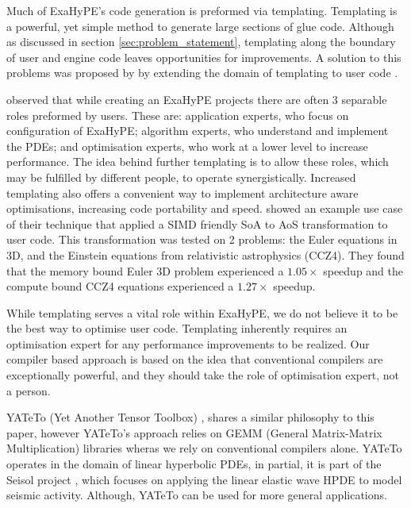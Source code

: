 


Much of ExaHyPE's code generation is preformed via templating.
Templating is a powerful, yet simple method to generate large sections of glue code.
Although as discussed in section \ref{sec:problem_statement}, templating along the boundary of user and engine code leaves opportunities for improvements.  
A solution to this problems was proposed by \citeauthor{templateExahype} by extending the domain of templating to user code \cite{templateExahype}.

\citeauthor{templateExahype} observed that while creating an ExaHyPE projects there are often 3 separable roles preformed by users.
These are: application experts, who focus on configuration of ExaHyPE; algorithm experts, who understand and implement the PDEs; and optimisation experts, who work at a lower level to increase performance.
The idea behind further templating is to allow these roles, which may be fulfilled by different people, to operate synergistically.
Increased templating also offers a convenient way to implement architecture aware optimisations, increasing code portability and speed.
\citeauthor{templateExahype} showed an example use case of their technique that applied a SIMD friendly SoA to AoS transformation to user code.
This transformation was tested on 2 problems: the Euler equations in 3D, and the Einstein equations from relativistic astrophysics (CCZ4).
They found that the memory bound Euler 3D problem experienced a $1.05\times$ speedup and the compute bound CCZ4 equations experienced a $1.27\times$ speedup.

While templating serves a vital role within ExaHyPE, we do not believe it to be the best way to optimise user code.
Templating inherently requires an optimisation expert for any performance improvements to be realized.
Our compiler based approach is based on the idea that conventional compilers are exceptionally powerful, and they should take the role of optimisation expert, not a person. 



YATeTo (Yet Another Tensor Toolbox) \cite{YATeTo}, shares a similar philosophy to this paper, however YATeTo's approach relies on GEMM (General Matrix-Matrix Multiplication) libraries wheras we rely on conventional compilers alone.
YATeTo operates in the domain of linear hyperbolic PDEs, in partial, it is part of the Seisol project \cite{seisolPFLOP}, which focuses on applying the linear elastic wave HPDE to model seismic activity.
Although, YATeTo can be used for more general applications.


